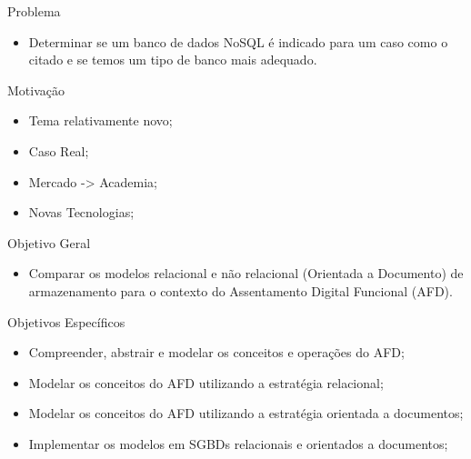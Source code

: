 \begin{frame}{Problema}
    \begin{itemize}
           \item Determinar se um banco de dados NoSQL é indicado para um caso como o citado e se temos um tipo de banco mais adequado.
    \end{itemize}
\end{frame}




\begin{frame}{Motivação}
    \begin{itemize}
    \item Tema relativamente novo;
    \item Caso Real;
    \item Mercado -> Academia;
    \item Novas Tecnologias;
    \end{itemize}
\end{frame}


\begin{frame}{Objetivo Geral}
    \begin{itemize}
    \item Comparar os modelos relacional e não relacional (Orientada a Documento) de armazenamento  para o contexto do Assentamento Digital Funcional (AFD).
    \end{itemize}
\end{frame}


\begin{frame}{Objetivos Específicos}
    \begin{itemize}
    \item Compreender, abstrair e modelar os conceitos e operações do AFD;
    \item Modelar os conceitos do AFD utilizando a estratégia relacional;
    \item Modelar os conceitos do AFD utilizando a estratégia orientada a documentos;
    \item Implementar os modelos em SGBDs relacionais e orientados a documentos;
    \end{itemize}
\end{frame}

